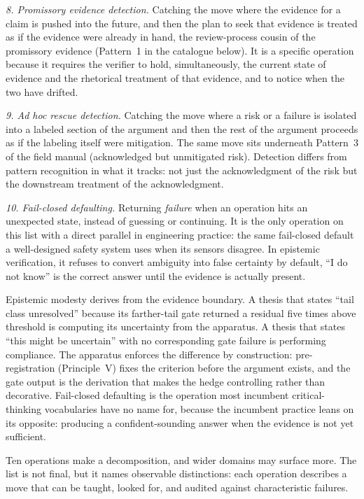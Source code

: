 \documentclass[
  11pt,
]{article}
\begin{document}
\emph{8. Promissory evidence detection.} Catching the move
where the evidence for a claim is pushed into the
future, and then the plan to seek that evidence is treated as if the
evidence were already in hand, the review-process cousin of the
promissory evidence (Pattern~1 in the catalogue below). It is a specific operation
because it requires the verifier to hold, simultaneously, the current
state of evidence and the rhetorical treatment of that evidence, and to
notice when the two have drifted.

\emph{9. Ad hoc rescue detection.} Catching the move
where a risk or a failure is isolated into a labeled section of the
argument and then the rest of the argument proceeds as if the labeling
itself were mitigation. The same move sits underneath Pattern~3 of
the field manual (acknowledged but unmitigated risk). Detection
differs from pattern recognition in what it tracks: not just the
acknowledgment of the risk
but the downstream treatment of the acknowledgment.

\emph{10. Fail-closed defaulting.} Returning \emph{failure}
when an operation hits an unexpected state, instead of guessing or
continuing. It is the only operation on this list with a direct
parallel in engineering practice: the same fail-closed default
a well-designed safety system uses when its sensors disagree. In
epistemic verification, it refuses to convert
ambiguity into false certainty by default, ``I do not
know'' is the correct answer until the evidence is actually present.

Epistemic modesty derives
from the evidence boundary. A thesis that states ``tail class
unresolved'' because its farther-tail gate returned a residual five times
above threshold is computing its uncertainty from the apparatus. A
thesis that states ``this might be uncertain'' with no corresponding
gate failure is performing compliance. The apparatus
enforces the difference by construction: pre-registration (Principle~V) fixes the
criterion before the argument exists, and the gate output is the
derivation that makes the hedge controlling rather than decorative.
Fail-closed defaulting is the operation most incumbent critical-thinking
vocabularies have no name for, because the incumbent practice
leans on its opposite: producing a confident-sounding
answer when the evidence is not yet sufficient.

Ten operations make a decomposition, and wider domains may surface
more. The list is not final, but it names observable distinctions: each operation describes a move
that can be taught, looked for, and audited against characteristic
failures.
\end{document}

